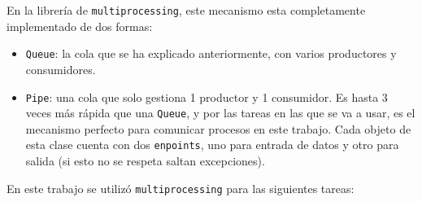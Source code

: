 En la librería de \texttt{multiprocessing}, este mecanismo esta completamente implementado de dos formas:
\begin{itemize}
    \item \texttt{Queue}: la cola que se ha explicado anteriormente, con varios productores y consumidores.
    \item \texttt{Pipe}: una cola que solo gestiona 1 productor y 1 consumidor. Es hasta 3 veces más rápida que una \texttt{Queue}, y por las tareas en las que se va a usar, es el mecanismo perfecto 
    para comunicar procesos en este trabajo. Cada objeto de esta clase cuenta con dos \texttt{enpoints}, uno para entrada de datos y otro para salida (si esto no se respeta saltan excepciones).
\end{itemize}
\clearpage
En este trabajo se utilizó \texttt{multiprocessing} para las siguientes tareas:
